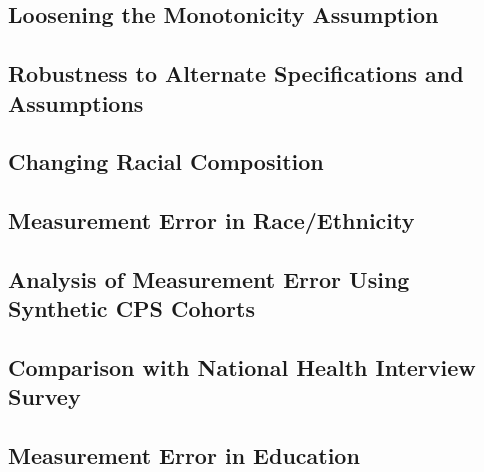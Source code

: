 \documentclass[12pt,letterpaper]{article}
\numberwithin{equation}{section}
\begin{document}
\begin{appendix}
\subsection{Loosening the Monotonicity Assumption}
\label{sec:app_nonmon}
\normalsize 

\subsection{Robustness to Alternate Specifications and Assumptions}
\label{sec:app_assumptions}
\normalsize 

\clearpage
\subsection{Changing Racial Composition} 
\label{sec:app_race_distrib} 
\normalsize 

\clearpage
\subsection{Measurement Error in Race/Ethnicity} 
\label{sec:app_hisp}
\normalsize 

\clearpage
\subsection{Analysis of Measurement Error Using Synthetic CPS Cohorts}
\label{sec:app_cps_cohorts}
\normalsize 

\clearpage
\subsection{Comparison with National Health Interview Survey}
\label{sec:app_nhis}
\normalsize 

\clearpage
\subsection{Measurement Error in Education} 
\label{sec:app_ed_error} 
\normalsize 

\end{appendix}
\end{document}
